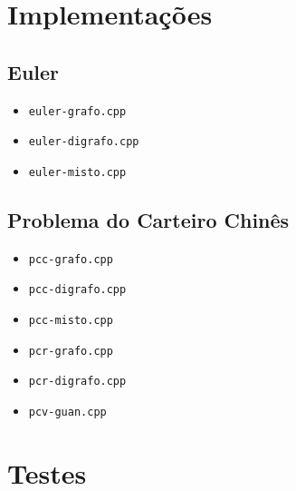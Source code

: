 \section{Implementações}

\subsection{Euler}

\begin{itemize}
    \item \texttt{euler-grafo.cpp}
    \item \texttt{euler-digrafo.cpp}
    \item \texttt{euler-misto.cpp}
\end{itemize}

\subsection{Problema do Carteiro Chinês}
\begin{itemize}
    \item \texttt{pcc-grafo.cpp}
    \item \texttt{pcc-digrafo.cpp}
    \item \texttt{pcc-misto.cpp}
    \item \texttt{pcr-grafo.cpp}
    \item \texttt{pcr-digrafo.cpp}
    \item \texttt{pcv-guan.cpp}
\end{itemize}

\section{Testes}
